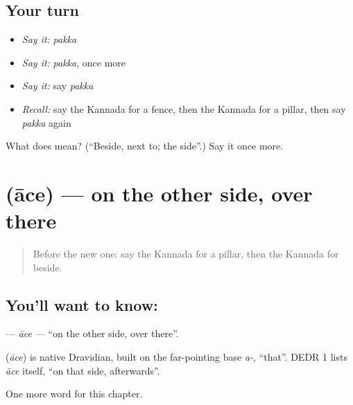 \subsection*{Your turn}
\begin{itemize}
\raggedright
  \item \emph{Say it:} \emph{pakka}
  \item \emph{Say it:} \emph{pakka}, once more
  \item \emph{Say it:} say \emph{pakka}
  \item \emph{Recall:} say the Kannada for a fence, then the Kannada for a pillar, then say \emph{pakka} again
\end{itemize}

\begin{tcolorbox}[breakable,colback=teal!4,colframe=teal!35!black,title={Before you move on}]
What does  mean? (\textquotedblleft{}Beside, next to; the side\textquotedblright{}.) Say it once more.
\end{tcolorbox}
\section[\texorpdfstring{\kn{ಆಚೆ} (āce)}{ಆಚೆ (āce)}]{ (āce) — on the other side, over there}

\label{lesson:KA-C175-ace}



\begin{quote}
Before the new one: say the Kannada for a pillar, then the Kannada for beside.
\end{quote}

\subsection*{You'll want to know: }
\textbf{} — \emph{āce} — \textquotedblleft{}on the other side, over there\textquotedblright{}.

\begin{cousinweb}
\textbf{} (\emph{āce}) is native Dravidian, built on the far-pointing base \emph{a-}, \textquotedblleft{}that\textquotedblright{}. DEDR 1 lists \emph{āce} itself, \textquotedblleft{}on that side, afterwards\textquotedblright{}.
\end{cousinweb}

\begin{grammarlens}[title={What you've built}]
One more word for this chapter.
\end{grammarlens}


